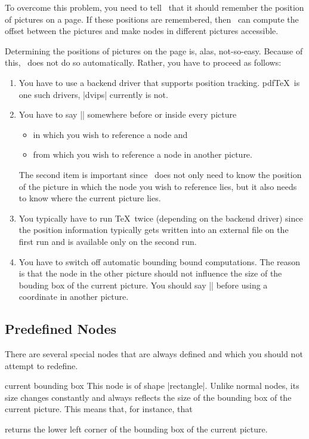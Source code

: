 To overcome this problem, you need to tell \pgfname\ that it should
remember the position of pictures on a page. If these positions are
remembered, then \pgfname\ can compute the offset between the pictures
and make nodes in different pictures accessible.

Determining the positions of pictures on the page is, alas,
not-so-easy. Because of this, \pgfname\ does not do so
automatically. Rather, you have to proceed as follows:
\begin{enumerate}
\item You have to use a backend driver that supports position
  tracking. pdf\TeX\ is one such drivers, |dvips| currently is not.
\item You have to say |\pgfrememberpicturepositiononpagetrue|
  somewhere before or inside every picture
  \begin{itemize}
  \item in which you wish to reference a node and
  \item from which you wish to reference a node in another picture.
  \end{itemize}
  The second item is important since \pgfname\ does not only need to
  know the position of the picture in which the node you wish to
  reference lies, but it also needs to know where the current picture
  lies.
\item You typically have to run \TeX\ twice (depending on the backend
  driver) since the position information typically gets written into
  an external file on the first run and is available only on the
  second run.
\item You have to switch off automatic bounding bound
  computations. The reason is that the node in the other picture
  should not influence the size of the bouding box of the current
  picture. You should say || before
  using a coordinate in another picture.
\end{enumerate}



\subsection{Predefined Nodes}

There are several special nodes that are always defined and which you
should not attempt to redefine.

\begin{predefinednode}{current bounding box}
  This node is of shape |rectangle|. Unlike normal nodes, its size
  changes constantly and always reflects the size of the bounding box
  of the current picture. This means that, for instance, that
\begin{codeexample}
\end{codeexample}
  returns the lower left corner of the bounding box of the current
  picture. 
\end{predefinednode}

